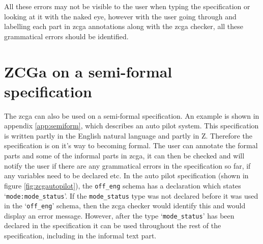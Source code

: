 All these errors may not be visible to the user when typing the specification or
looking at it with the naked eye, however with the user going through and
labelling each part in \gls{zcga} annotations along with the \gls{zcga} checker,
all these grammatical errors should be identified.

\section{ZCGa on a semi-formal specification}
\label{sec:zcgaonsemi}

The \gls{zcga} can also be used on a semi-formal specification. An example is shown
in appendix \ref{app:semiform}, which describes an auto pilot system. This
specification is written partly in the English natural language and partly in Z.
Therefore the specification is on it's way to becoming formal. The user can
annotate the formal parts and some of the informal parts in \gls{zcga}, it can
then be checked and will notify the user if there are any grammatical errors in the
specification so far, if any variables need to be
declared etc. In the auto pilot specification (shown in figure \ref{fig:zcgautopilot}), the \verb|off_eng|
schema has a declaration which states `\verb|mode:mode_status|'. If the \verb|mode_status| type was not declared before
it was used in the `\verb|off_eng|' schema, then the \gls{zcga} checker would
identify this and would display an error message. However, after the type
`\verb|mode_status|' has been declared in the specification it can be used
throughout the rest of the specification, including in the informal text part.

